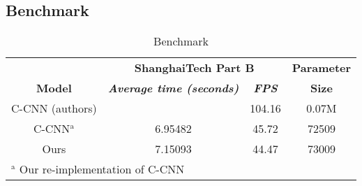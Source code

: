 

\subsection{Benchmark}


\begin{table}[htbp]
\caption{\label{tab:experiment-result}  Benchmark}
\begin{center}
\begin{tabular}{|c|c|c|c|}
\hline
\textbf{}&\multicolumn{2}{|c|}{\textbf{ShanghaiTech Part B}}&\textbf{Parameter} \\
\cline{1-3}
\textbf{Model} & \textbf{\textit{ Average time (seconds) }}& \textbf{\textit{FPS}}&\textbf{Size} \\
\hline
C-CNN (authors) &  &  104.16 & 0.07M \\
\hline
C-CNN$^{\mathrm{a}}$  & 6.95482 & 45.72 & 72509   \\
\hline
Ours &  7.15093 & 44.47 & 73009 \\
\hline
\multicolumn{4}{l}{$^{\mathrm{a}}$ Our re-implementation of C-CNN}
\end{tabular}

\end{center}
\end{table}